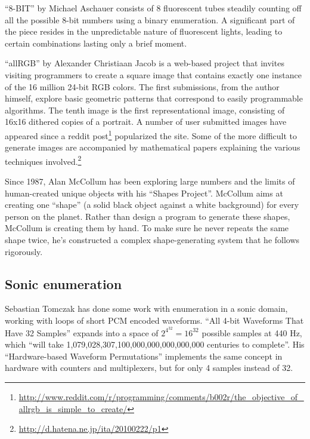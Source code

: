 \documentclass{thesis}
\begin{document}
	\cite{michael_aschauer_8-bit_????}
	``8-BIT'' by Michael Aschauer consists of 8 fluorescent tubes steadily counting off all the possible 8-bit numbers using a binary enumeration. A significant part of the piece resides in the unpredictable nature of fluorescent lights, leading to certain combinations lasting only a brief moment.
	
	``allRGB'' by Alexander Christiaan Jacob\cite{alexander_christiaan_jacob_allrgb_2008} is a web-based project that invites visiting programmers to create a square image that contains exactly one instance of the 16 million 24-bit RGB colors. The first submissions, from the author himself, explore basic geometric patterns that correspond to easily programmable algorithms. The tenth image is the first representational image, consisting of 16x16 dithered copies of a portrait. A number of user submitted images have appeared since a reddit post\footnote{\url{http://www.reddit.com/r/programming/comments/b002r/the\_objective\_of\_allrgb\_is\_simple\_to\_create/}} popularized the site. Some of the more difficult to generate images are accompanied by mathematical papers explaining the various techniques involved.\footnote{\url{http://d.hatena.ne.jp/ita/20100222/p1}}
		
	Since 1987, Alan McCollum has been exploring large numbers and the limits of human-created unique objects with his ``Shapes Project''.\cite{allan_mccollum_shapes_2006} McCollum aims at creating one ``shape'' (a solid black object against a white background) for every person on the planet. Rather than design a program to generate these shapes, McCollum is creating them by hand. To make sure he never repeats the same shape twice, he's constructed a complex shape-generating system that he follows rigorously. 

\subsection{Sonic enumeration}

	Sebastian Tomczak has done some work with enumeration in a sonic domain, working with loops of short PCM encoded waveforms. ``All 4-bit Waveforms That Have 32 Samples''\cite{tomczak_all_2009} expands into a space of $2^{4^{32}}=16^{32}$ possible samples at 440 Hz, which ``will take 1,079,028,307,100,000,000,000,000,000 centuries to complete''. His ``Hardware-based Waveform Permutations''\cite{tomczak_hardware-based_2009} implements the same concept in hardware with counters and multiplexers, but for only 4 samples instead of 32.
	
\end{document}
